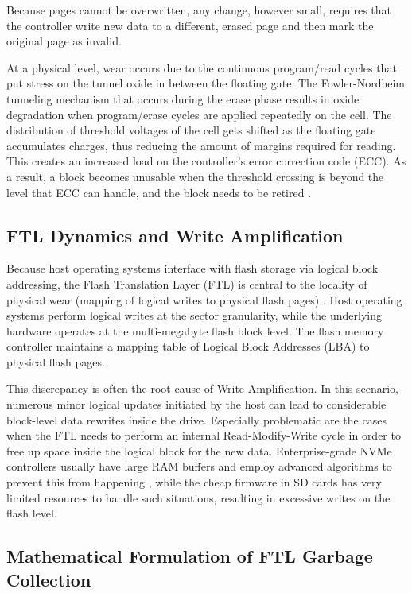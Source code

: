 \documentclass[conference]{IEEEtran}
\begin{document}
Because pages cannot be overwritten, any change, however small, requires that the controller write new data to a different, erased page and then mark the original page as invalid. 

At a physical level, wear occurs due to the continuous program/read cycles that put stress on the tunnel oxide in between the floating gate. The Fowler-Nordheim tunneling mechanism that occurs during the erase phase results in oxide degradation when program/erase cycles are applied repeatedly on the cell. The distribution of threshold voltages of the cell gets shifted as the floating gate accumulates charges, thus reducing the amount of margins required for reading. This creates an increased load on the controller’s error correction code (ECC). As a result, a block becomes unusable when the threshold crossing is beyond the level that ECC can handle, and the block needs to be retired \cite{b6}.

\subsection{FTL Dynamics and Write Amplification}

Because host operating systems interface with flash storage via logical block addressing, the Flash Translation Layer (FTL) is central to the locality of physical wear (mapping of logical writes to physical flash pages) \cite{b7}. Host operating systems perform logical writes at the sector granularity, while the underlying hardware operates at the multi-megabyte flash block level. The flash memory controller maintains a mapping table of Logical Block Addresses (LBA) to physical flash pages.

This discrepancy is often the root cause of Write Amplification. In this scenario, numerous minor logical updates initiated by the host can lead to considerable block-level data rewrites inside the drive. Especially problematic are the cases when the FTL needs to perform an internal Read-Modify-Write cycle in order to free up space inside the logical block for the new data. Enterprise-grade NVMe controllers usually have large RAM buffers and employ advanced algorithms to prevent this from happening \cite{b11}, while the cheap firmware in SD cards has very limited resources to handle such situations, resulting in excessive writes on the flash level.

\subsection{Mathematical Formulation of FTL Garbage Collection}
\end{document}
